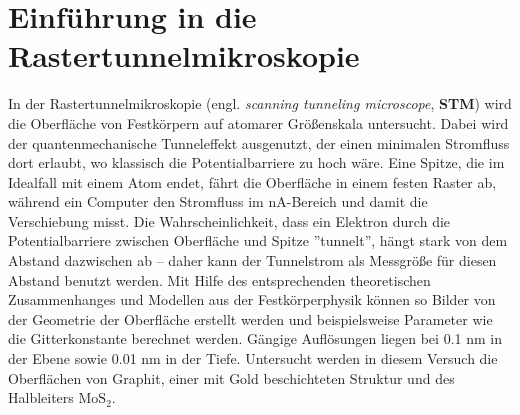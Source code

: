 \section{Einführung in die Rastertunnelmikroskopie}
In der Rastertunnelmikroskopie (engl. \textit{scanning tunneling
microscope}, \textbf{STM}) wird die Oberfläche von Festkörpern auf atomarer 
Größenskala untersucht. Dabei wird der quantenmechanische Tunneleffekt 
ausgenutzt, der einen minimalen Stromfluss dort erlaubt, wo klassisch 
die Potentialbarriere zu hoch wäre. Eine Spitze, die im Idealfall mit 
einem Atom endet, fährt die Oberfläche in einem festen Raster ab, während 
ein Computer den Stromfluss im nA-Bereich und damit die Verschiebung misst. 
Die Wahrscheinlichkeit, dass ein Elektron durch die Potentialbarriere 
zwischen Oberfläche und Spitze ”tunnelt”, hängt stark von dem Abstand 
dazwischen ab – daher kann der Tunnelstrom als Messgröße für diesen 
Abstand benutzt werden. Mit Hilfe des entsprechenden theoretischen 
Zusammenhanges und Modellen aus der Festkörperphysik können so Bilder 
von der Geometrie der Oberfläche erstellt werden und beispielsweise 
Parameter wie die Gitterkonstante berechnet werden. Gängige Auflösungen liegen
bei 0.1 nm in der Ebene sowie 0.01 nm in der Tiefe. Untersucht werden in 
diesem Versuch die Oberflächen von Graphit, einer mit Gold beschichteten 
Struktur und des Halbleiters $\mathrm{MoS_2}$. 

